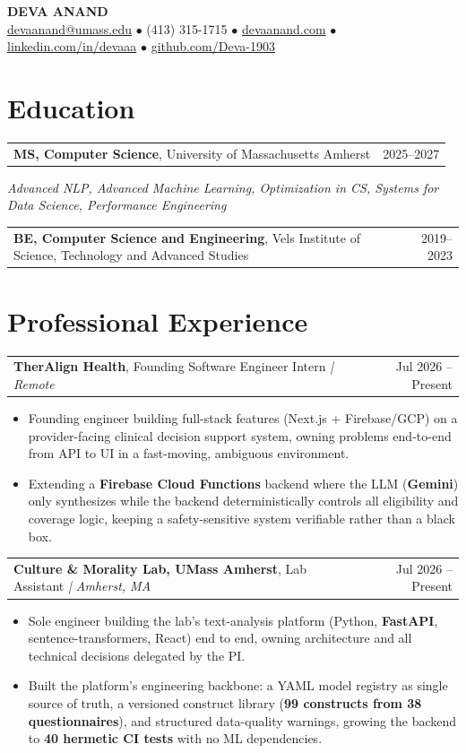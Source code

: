 \documentclass[letterpaper,11pt]{article}
\makeatletter
\newcommand{\eduItem}[3]{%
  \begin{tabular*}{\textwidth}{@{}l@{\extracolsep{\fill}}r@{}}
    \textbf{#1}, #2 & #3 \\
  \end{tabular*}\par
}
\newcommand{\expItem}[4]{%
  \vspace{2pt}
  \begin{tabular*}{\textwidth}{@{}l@{\extracolsep{\fill}}r@{}}
    \textbf{#1}, #2 \textit{| #3} & #4 \\
  \end{tabular*}\par\vspace{-3pt}
}
\makeatother
\begin{document}
\begin{center}
    {\fontsize{18}{20}\selectfont\bfseries DEVA ANAND}\\ \vspace{3pt}
    {\small
    \href{mailto:devaanand@umass.edu}{devaanand@umass.edu}
    \enspace$\bullet$\enspace
    (413) 315-1715
    \enspace$\bullet$\enspace
    \href{https://devaanand.com}{devaanand.com}
    \enspace$\bullet$\enspace
    \href{https://linkedin.com/in/devaaa/}{linkedin.com/in/devaaa}
    \enspace$\bullet$\enspace
    \href{https://github.com/Deva-1903}{github.com/Deva-1903}}
\end{center}
\vspace{-8pt}

\section{Education}
\eduItem{MS, Computer Science}{University of Massachusetts Amherst}{2025--2027}
{\small\textit{Advanced NLP, Advanced Machine Learning, Optimization in CS, Systems for Data Science, Performance Engineering}}\par
\vspace{3pt}
\eduItem{BE, Computer Science and Engineering}{Vels Institute of Science, Technology and Advanced Studies}{2019--2023}

\section{Professional Experience}

\expItem{TherAlign Health}{Founding Software Engineer Intern}{Remote}{Jul 2026 -- Present}
\begin{itemize}
  \item Founding engineer building full-stack features (Next.js + Firebase/GCP) on a provider-facing clinical decision support system, owning problems end-to-end from API to UI in a fast-moving, ambiguous environment.
  \item Extending a \textbf{Firebase Cloud Functions} backend where the LLM (\textbf{Gemini}) only synthesizes while the backend deterministically controls all eligibility and coverage logic, keeping a safety-sensitive system verifiable rather than a black box.
\end{itemize}

\expItem{Culture \& Morality Lab, UMass Amherst}{Lab Assistant}{Amherst, MA}{Jul 2026 -- Present}
\begin{itemize}
  \item Sole engineer building the lab's text-analysis platform (Python, \textbf{FastAPI}, sentence-transformers, React) end to end, owning architecture and all technical decisions delegated by the PI.
  \item Built the platform's engineering backbone: a YAML model registry as single source of truth, a versioned construct library (\textbf{99 constructs from 38 questionnaires}), and structured data-quality warnings, growing the backend to \textbf{40 hermetic CI tests} with no ML dependencies.
\end{itemize}
\end{document}
